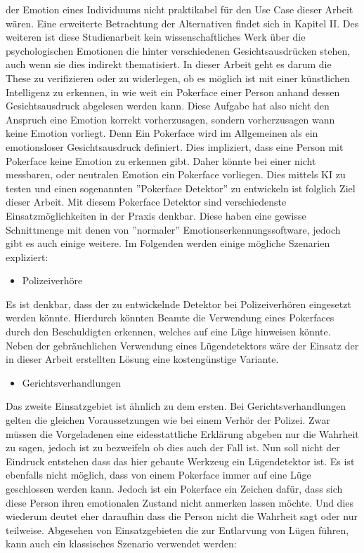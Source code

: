 \documentclass[12pt, a4paper]{scrbook}
\begin{document}
der Emotion eines Individuums nicht praktikabel für den Use Case dieser Arbeit wären. Eine erweiterte Betrachtung der Alternativen findet sich in Kapitel II. Des weiteren ist diese
Studienarbeit kein wissenschaftliches Werk über die psychologischen Emotionen die hinter verschiedenen Gesichtsausdrücken stehen, auch wenn sie dies indirekt thematisiert. In dieser Arbeit geht es darum die
These zu verifizieren oder zu widerlegen, ob es möglich ist mit einer künstlichen Intelligenz zu erkennen, in wie weit ein Pokerface einer Person anhand dessen Gesichtsausdruck abgelesen werden
kann. Diese Aufgabe hat also nicht den Anspruch eine Emotion korrekt vorherzusagen, sondern vorherzusagen wann keine Emotion vorliegt. Denn Ein Pokerface wird im Allgemeinen als ein
emotionsloser Gesichtsausdruck definiert. Dies impliziert, dass eine Person mit Pokerface keine Emotion zu erkennen gibt. Daher könnte bei einer nicht messbaren, oder neutralen Emotion ein
Pokerface vorliegen. Dies mittels KI zu testen und einen sogenannten ''Pokerface Detektor'' zu entwickeln ist folglich Ziel dieser Arbeit. Mit diesem Pokerface Detektor sind verschiedenste
Einsatzmöglichkeiten in der Praxis denkbar. Diese haben eine gewisse Schnittmenge mit denen von ''normaler'' Emotionserkennungssoftware, jedoch gibt es auch einige weitere. Im Folgenden werden
einige mögliche Szenarien expliziert:
\begin{itemize}
	\item{Polizeiverhöre}
\end{itemize}
Es ist denkbar, dass der zu entwickelnde Detektor bei Polizeiverhören eingesetzt werden könnte. Hierdurch könnten Beamte die Verwendung eines Pokerfaces durch den Beschuldigten erkennen, welches auf eine Lüge hinweisen könnte. Neben der gebräuchlichen Verwendung eines Lügendetektors wäre der Einsatz der in dieser Arbeit erstellten Lösung eine kostengünstige Variante.
\begin{itemize}
	\item{Gerichtsverhandlungen}
\end{itemize}
Das zweite Einsatzgebiet ist ähnlich zu dem ersten. Bei Gerichtsverhandlungen gelten die gleichen Voraussetzungen wie bei einem Verhör der Polizei. Zwar müssen die Vorgeladenen eine
eidesstattliche Erklärung abgeben nur die Wahrheit zu sagen, jedoch ist zu bezweifeln ob dies auch der Fall ist.
Nun soll nicht der Eindruck entstehen dass das hier gebaute Werkzeug ein Lügendetektor ist. Es ist ebenfalls nicht möglich, dass von einem Pokerface immer auf eine Lüge geschlossen werden kann.
Jedoch ist ein Pokerface ein Zeichen dafür, dass sich diese Person ihren emotionalen Zustand nicht anmerken lassen möchte. Und dies wiederum deutet eher daraufhin dass die Person nicht die
Wahrheit sagt oder nur teilweise.
Abgesehen von Einsatzgebieten die zur Entlarvung von Lügen führen, kann auch ein klassisches Szenario verwendet werden:
\end{document}
